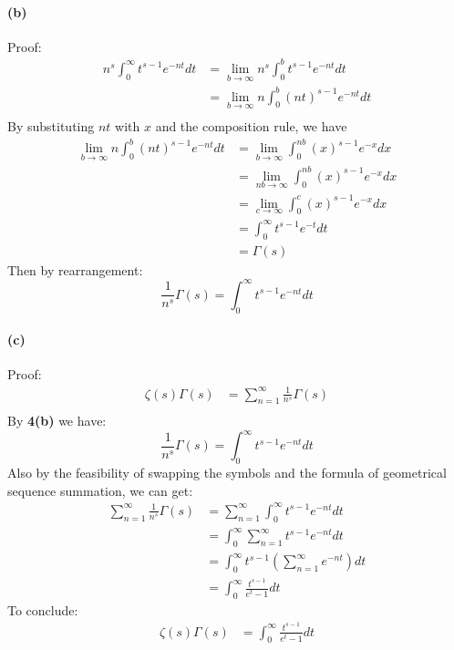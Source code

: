 \documentclass{article}
\def\to{\rightarrow}
\begin{document}
\paragraph{(b)}Proof: \\
\begin{align*}
    n^s\int_{0}^{\infty}t^{s-1}e^{-nt}dt&=
    \lim_{b\to\infty}n^s\int_{0}^{b}t^{s-1}e^{-nt}dt\\
    &=\lim_{b\to\infty}n\int_{0}^{b}(nt)^{s-1}e^{-nt}dt\\
\end{align*}
By substituting $nt$ with $x$ and the composition rule, we have
\begin{align*}
    \lim_{b\to\infty}n\int_{0}^{b}(nt)^{s-1}e^{-nt}dt&=
    \lim_{b\to\infty}\int_{0}^{nb}(x)^{s-1}e^{-x}dx\\
    &=\lim_{nb\to\infty}\int_{0}^{nb}(x)^{s-1}e^{-x}dx\\
    &=\lim_{c\to\infty}\int_{0}^{c}(x)^{s-1}e^{-x}dx\\
    &=\int_{0}^{\infty }t^{s-1}e^{-t}dt\\
    &=\Gamma (s)
\end{align*}
Then by rearrangement:
$$\frac{1}{n^s}\Gamma (s)=\int_{0}^{\infty}t^{s-1}e^{-nt}dt$$



\paragraph{(c)}Proof:\\
\begin{align*}
    \zeta(s)\Gamma(s)&=\sum_{n=1}^{\infty}\frac{1}{n^s}\Gamma(s)\\
\end{align*}
By \textbf{4(b)} we have:
$$\frac{1}{n^s}\Gamma (s)=\int_{0}^{\infty}t^{s-1}e^{-nt}dt$$
Also by the feasibility of swapping the symbols and the formula of geometrical sequence summation, we can get:
\begin{align*}
    \sum_{n=1}^{\infty}\frac{1}{n^s}\Gamma(s)&=\sum_{n=1}^{\infty}\int_{0}^{\infty}t^{s-1}e^{-nt}dt\\
    &=\int_{0}^{\infty}\sum_{n=1}^{\infty}t^{s-1}e^{-nt}dt\\
    &=\int_{0}^{\infty}t^{s-1}(\sum_{n=1}^{\infty}e^{-nt})dt\\
    &=\int_{0}^{\infty}\frac{t^{s-1}}{e^t-1}dt
\end{align*}
To conclude:
\begin{align*}
    \zeta(s)\Gamma(s)&=\int_{0}^{\infty}\frac{t^{s-1}}{e^t-1}dt\\
\end{align*}
\end{document}
